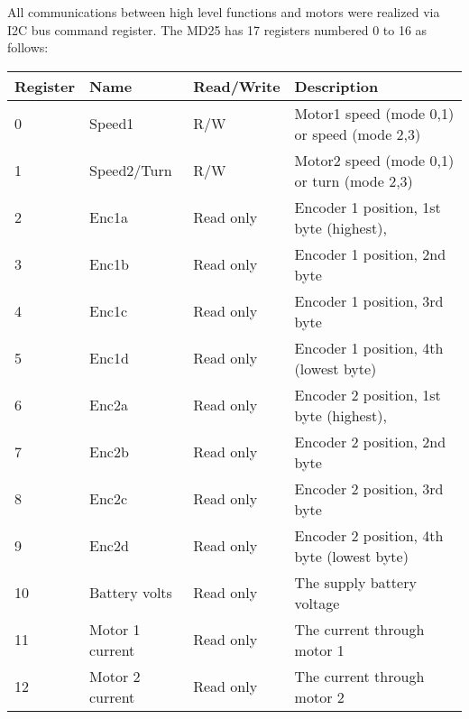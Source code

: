 All communications between high level functions and motors were realized via  I2C bus command register.
The MD25 has 17 registers numbered 0 to 16 as follows:
\begin{table}[!h]
	\begin{tabular}{@{}llll@{}}
		\toprule
		\textbf{Register} & \textbf{Name}     & \textbf{Read/Write} & \textbf{Description}                                             \\ \midrule
		0                 & Speed1            & R/W                 & Motor1 speed (mode 0,1) or speed (mode 2,3)                      \\
		1                 & Speed2/Turn       & R/W                 & Motor2 speed (mode 0,1) or turn (mode 2,3)                       \\
		2                 & Enc1a             & Read only           & Encoder 1 position, 1st byte (highest),   \\
		3                 & Enc1b             & Read only           & Encoder 1 position, 2nd byte                                     \\
		4                 & Enc1c             & Read only           & Encoder 1 position, 3rd byte                                     \\
		5                 & Enc1d             & Read only           & Encoder 1 position, 4th (lowest byte)                            \\
		6                 & Enc2a             & Read only           & Encoder 2 position, 1st  byte (highest),  \\
		7                 & Enc2b             & Read only           & Encoder 2 position, 2nd byte                                     \\
		8                 & Enc2c             & Read only           & Encoder 2 position, 3rd byte                                     \\
		9                 & Enc2d             & Read only           & Encoder 2 position, 4th byte (lowest byte)                       \\
		10                & Battery volts     & Read only           & The supply battery voltage                                       \\
		11                & Motor 1 current   & Read only           & The current through motor 1                                      \\
		12                & Motor 2 current   & Read only           & The current through motor 2                                      \\

\end{tabular}
\end{table}
